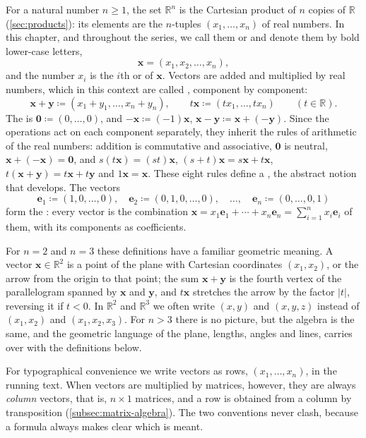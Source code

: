 For a natural number $n\ge1$, the set $\mathbb R^n$ is the Cartesian product of $n$ copies of $\mathbb R$ (\cref{sec:products}): its elements are the $n$-tuples $(x_1,\ldots,x_n)$ of real numbers. In this chapter, and throughout the series, we call them  or  and denote them by bold lower-case letters,
\[
\mathbf x=(x_1,x_2,\ldots,x_n),
\]
and the number $x_i$ is the $i$th  or  of $\mathbf x$. Vectors are added and multiplied by real numbers, which in this context are called , component by component:
\[
\mathbf x+\mathbf y\coloneqq(x_1+y_1,\ldots,x_n+y_n),\qquad t\mathbf x\coloneqq(tx_1,\ldots,tx_n)\qquad(t\in\mathbb R).
\]
The  is $\mathbf 0\coloneqq(0,\ldots,0)$, and $-\mathbf x\coloneqq(-1)\mathbf x$, $\mathbf x-\mathbf y\coloneqq\mathbf x+(-\mathbf y)$. Since the operations act on each component separately, they inherit the rules of arithmetic of the real numbers: addition is commutative and associative, $\mathbf 0$ is neutral, $\mathbf x+(-\mathbf x)=\mathbf 0$, and $s(t\mathbf x)=(st)\mathbf x$, $(s+t)\mathbf x=s\mathbf x+t\mathbf x$, $t(\mathbf x+\mathbf y)=t\mathbf x+t\mathbf y$ and $1\mathbf x=\mathbf x$. These eight rules define a , the abstract notion that  develops. The vectors
\[
\mathbf e_1\coloneqq(1,0,\ldots,0),\quad\mathbf e_2\coloneqq(0,1,0,\ldots,0),\quad\ldots,\quad\mathbf e_n\coloneqq(0,\ldots,0,1)
\]
form the : every vector is the combination $\mathbf x=x_1\mathbf e_1+\cdots+x_n\mathbf e_n=\sum_{i=1}^nx_i\mathbf e_i$ of them, with its components as coefficients.

For $n=2$ and $n=3$ these definitions have a familiar geometric meaning. A vector $\mathbf x\in\mathbb R^2$ is a point of the plane with Cartesian coordinates $(x_1,x_2)$, or the arrow from the origin to that point; the sum $\mathbf x+\mathbf y$ is the fourth vertex of the parallelogram spanned by $\mathbf x$ and $\mathbf y$, and $t\mathbf x$ stretches the arrow by the factor $|t|$, reversing it if $t<0$. In $\mathbb R^2$ and $\mathbb R^3$ we often write $(x,y)$ and $(x,y,z)$ instead of $(x_1,x_2)$ and $(x_1,x_2,x_3)$. For $n>3$ there is no picture, but the algebra is the same, and the geometric language of the plane, lengths, angles and lines, carries over with the definitions below.

For typographical convenience we write vectors as rows, $(x_1,\ldots,x_n)$, in the running text. When vectors are multiplied by matrices, however, they are always \emph{column} vectors, that is, $n\times1$ matrices, and a row is obtained from a column by transposition (\cref{subsec:matrix-algebra}). The two conventions never clash, because a formula always makes clear which is meant.

